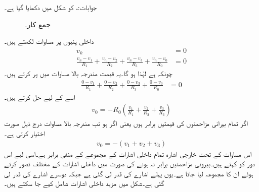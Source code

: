 جوابات:، 
 کو شکل  میں دکھایا گیا ہے۔
\begin{figure}
\centering
{}
\caption{جمع کار۔}
\label{شکل_حسابی_جمع_کار}
\end{figure}
داخلی پنیوں پر مساوات لکھتے ہیں۔
\begin{align*}
v_k&=0\\
\frac{v_n-v_1}{R_1}+\frac{v_n-v_2}{R_2}+\frac{v_n-v_3}{R_3}+\frac{v_n-v_0}{R_0}&=0
\end{align*}
چونکہ  ہے لہٰذا  ہو گا۔یہ قیمت مندرجہ بالا مساوات میں پر کرتے ہیں۔
\begin{align*}
\frac{0-v_1}{R_1}+\frac{0-v_2}{R_2}+\frac{0-v_3}{R_3}+\frac{0-v_0}{R_0}&=0
\end{align*}
اسے  کے لیے حل کرتے ہیں۔
\begin{align}
v_0=-R_0\left(\frac{v_1}{R_1}+\frac{v_2}{R_2}+\frac{v_3}{R_3}\right)
\end{align}
اگر تمام بیرانی مزاحمتوں کی قیمتیں برابر ہوں یعنی اگر  ہو تب مندرجہ بالا مساوات درج ذیل صورت اختیار کرتی ہے۔
\begin{align}
v_0=-\left(v_1+v_2+v_3\right)
\end{align}
اس مساوات کے تحت خارجی اشارہ تمام داخلی اشارات کے مجموعے کے منفی برابر ہے۔اسی لیے اس دور کو  کہتے ہیں۔بیرونی مزاحمتیں برابر نہ ہونے کی صورت میں داخلی اشارات کے  مختلف تصور کرتے ہوئے ان کا مجموعہ لیا جاتا ہے۔یوں پہلے اشارے کی قدر  لی گئی ہے جبکہ دوسرے اشارے کی قدر  لی گئی ہے۔شکل  میں مزید داخلی اشارات شامل کیے جا سکتے ہیں۔


